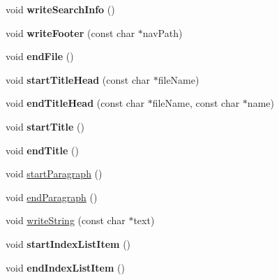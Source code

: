 \begin{DoxyCompactItemize}
\item 
\hypertarget{class_output_list_ac9f113172cc5a97370c617e213bcef3d}{void {\bfseries write\-Search\-Info} ()}\label{class_output_list_ac9f113172cc5a97370c617e213bcef3d}

\item 
\hypertarget{class_output_list_a7a5851ef00c52f6045b3175cfbcb76d2}{void {\bfseries write\-Footer} (const char $\ast$nav\-Path)}\label{class_output_list_a7a5851ef00c52f6045b3175cfbcb76d2}

\item 
\hypertarget{class_output_list_a91124168a972dfb54e63eb80980bd7c4}{void {\bfseries end\-File} ()}\label{class_output_list_a91124168a972dfb54e63eb80980bd7c4}

\item 
\hypertarget{class_output_list_a5c1610aed78932790e393969eb5caf3b}{void {\bfseries start\-Title\-Head} (const char $\ast$file\-Name)}\label{class_output_list_a5c1610aed78932790e393969eb5caf3b}

\item 
\hypertarget{class_output_list_a5c092681d24734b7879d57f03dd95d88}{void {\bfseries end\-Title\-Head} (const char $\ast$file\-Name, const char $\ast$name)}\label{class_output_list_a5c092681d24734b7879d57f03dd95d88}

\item 
\hypertarget{class_output_list_a1259e131d6695a4bb53ec5e36692840a}{void {\bfseries start\-Title} ()}\label{class_output_list_a1259e131d6695a4bb53ec5e36692840a}

\item 
\hypertarget{class_output_list_a7b02cc485cad21197a018533aa05fe79}{void {\bfseries end\-Title} ()}\label{class_output_list_a7b02cc485cad21197a018533aa05fe79}

\item 
void \hyperlink{class_output_list_af7f590b00ecbe6117ddc09f0016df0ec}{start\-Paragraph} ()
\item 
void \hyperlink{class_output_list_a3076b52ebe72e4b56c232817cf2a16f0}{end\-Paragraph} ()
\item 
void \hyperlink{class_output_list_a02588a2412fdda1d3d31066be2802913}{write\-String} (const char $\ast$text)
\item 
\hypertarget{class_output_list_a54bfbe844dbbb52acf519e07a207c2e0}{void {\bfseries start\-Index\-List\-Item} ()}\label{class_output_list_a54bfbe844dbbb52acf519e07a207c2e0}

\item 
\hypertarget{class_output_list_aec53f232bba59300d9a4fd4b1cf0f753}{void {\bfseries end\-Index\-List\-Item} ()}\label{class_output_list_aec53f232bba59300d9a4fd4b1cf0f753}


\end{DoxyCompactItemize}
